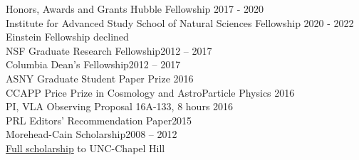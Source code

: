 \documentclass{resume_clark} %
\begin{document}
\begin{rSection}{Honors, Awards and Grants}
Hubble Fellowship \hfill{2017 - 2020}\\
Institute for Advanced Study School of Natural Sciences Fellowship \hfill{2020 - 2022}\\
Einstein Fellowship \hfill{declined}\\
NSF Graduate Research Fellowship\hfill {2012 -- 2017}\\
Columbia Dean's Fellowship\hfill {2012 -- 2017}\\
ASNY Graduate Student Paper Prize \hfill{2016}\\
CCAPP Price Prize in Cosmology and AstroParticle Physics \hfill{2016}\\
PI, VLA Observing Proposal 16A-133, 8 hours \hfill{2016}\\
PRL Editors' Recommendation Paper\hfill {2015}\\
Morehead-Cain Scholarship\hfill {2008 -- 2012}\\
\hspace*{0.5cm}\href{http://www.moreheadcain.org}{Full scholarship} to UNC-Chapel Hill\\

\end{rSection}



\end{document}
